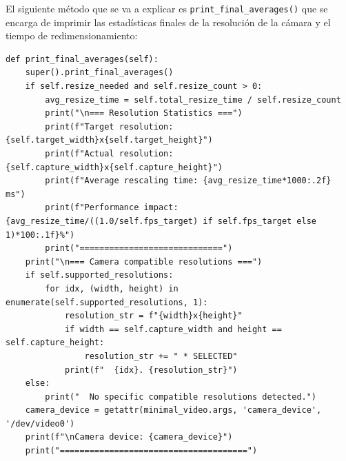 El siguiente método que se va a explicar es \texttt{print\_final\_averages()} que se encarga de imprimir las estadísticas finales de la resolución de la cámara y el tiempo de redimensionamiento:
\begin{lstlisting}[style=pythonstyle, caption={Método \texttt{print\_final\_averages()} de \textit{Minimal\_Video\_Resolution\_verbose}.}, label={lst:print_final_averages}]
def print_final_averages(self):
    super().print_final_averages()
    if self.resize_needed and self.resize_count > 0:
        avg_resize_time = self.total_resize_time / self.resize_count
        print("\n=== Resolution Statistics ===")
        print(f"Target resolution: {self.target_width}x{self.target_height}")
        print(f"Actual resolution: {self.capture_width}x{self.capture_height}")
        print(f"Average rescaling time: {avg_resize_time*1000:.2f} ms")
        print(f"Performance impact:     {avg_resize_time/((1.0/self.fps_target) if self.fps_target else 1)*100:.1f}%")
        print("=============================")
    print("\n=== Camera compatible resolutions ===")
    if self.supported_resolutions:
        for idx, (width, height) in enumerate(self.supported_resolutions, 1):
            resolution_str = f"{width}x{height}"
            if width == self.capture_width and height == self.capture_height:
                resolution_str += " * SELECTED"
            print(f"  {idx}. {resolution_str}")
    else:
        print("  No specific compatible resolutions detected.")
    camera_device = getattr(minimal_video.args, 'camera_device', '/dev/video0')
    print(f"\nCamera device: {camera_device}")
    print("======================================")
\end{lstlisting}
\vspace{\baselineskip}

